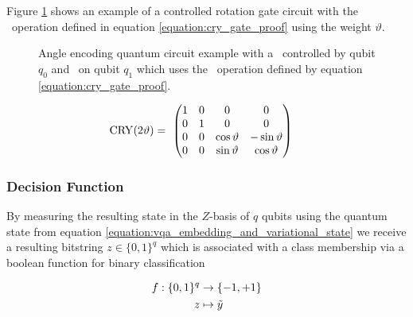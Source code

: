 Figure \ref{fig:cry_angle_embedding} shows an example of a controlled rotation gate circuit with the \crygate\ operation defined in equation \ref{equation:cry_gate_proof} using the weight $\vartheta$. 

\begin{figure}[!h]
    \centering
    \caption{Angle encoding quantum circuit example with a \crygate\ controlled by qubit $q_0$ and \rygate\ on qubit $q_1$ which uses the \crygate\ operation defined by equation \ref{equation:cry_gate_proof}.}
    \label{fig:cry_angle_embedding}
\end{figure}

\begin{equation}
    \centering
    \begin{split}
        \mathrm{CRY}(2\vartheta) &=\  
        \begin{pmatrix}
            1 & 0 & 0 & 0 \\
            0 & 1 & 0 & 0 \\
            0 & 0 & \cos{\vartheta} & -\sin{\vartheta} \\
            0 & 0 & \sin{\vartheta} &  \cos{\vartheta}
        \end{pmatrix}
    \end{split}
    \label{equation:cry_gate_proof}
\end{equation}

\subsubsection{Decision Function}
By measuring the resulting state in the $Z$-basis of $q$ qubits using the quantum state from equation \ref{equation:vqa_embedding_and_variational_state} we receive a resulting bitstring $z \in \{0,1\}^q$ which is associated with a class membership via a boolean function for binary classification

\begin{equation} 
    \centering
    \begin{split}
        f:\{0,1\}^q & \rightarrow \{-1,+1\}\\
        z & \mapsto \tilde{y}
    \end{split}
    \label{equation:vqa_boolean_membership_function}
\end{equation}

